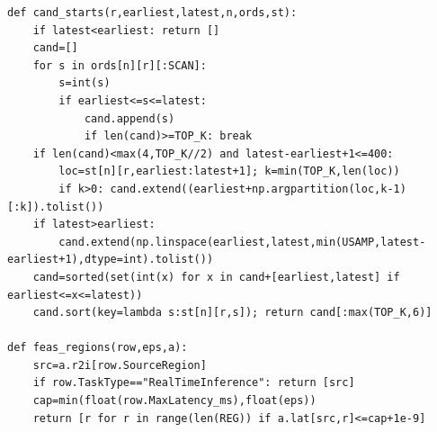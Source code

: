 \documentclass{article}
\begin{document}
\begin{lstlisting}
def cand_starts(r,earliest,latest,n,ords,st):
    if latest<earliest: return []
    cand=[]
    for s in ords[n][r][:SCAN]:
        s=int(s)
        if earliest<=s<=latest:
            cand.append(s)
            if len(cand)>=TOP_K: break
    if len(cand)<max(4,TOP_K//2) and latest-earliest+1<=400:
        loc=st[n][r,earliest:latest+1]; k=min(TOP_K,len(loc))
        if k>0: cand.extend((earliest+np.argpartition(loc,k-1)[:k]).tolist())
    if latest>earliest:
        cand.extend(np.linspace(earliest,latest,min(USAMP,latest-earliest+1),dtype=int).tolist())
    cand=sorted(set(int(x) for x in cand+[earliest,latest] if earliest<=x<=latest))
    cand.sort(key=lambda s:st[n][r,s]); return cand[:max(TOP_K,6)]

def feas_regions(row,eps,a):
    src=a.r2i[row.SourceRegion]
    if row.TaskType=="RealTimeInference": return [src]
    cap=min(float(row.MaxLatency_ms),float(eps))
    return [r for r in range(len(REG)) if a.lat[src,r]<=cap+1e-9]


\end{lstlisting}
\end{document}
